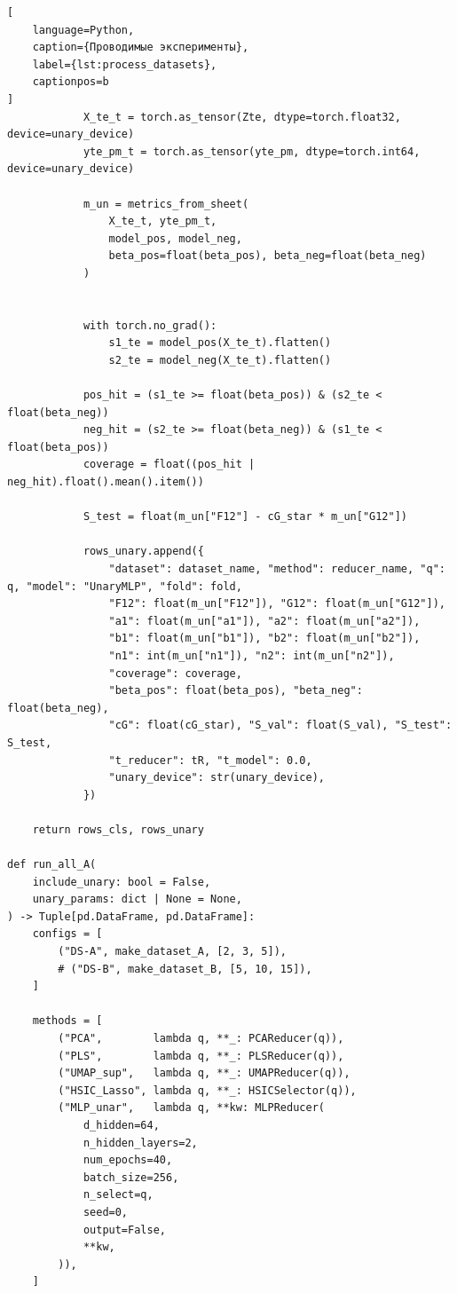 \documentclass[12pt,a4paper]{article}
\begin{document}
\begin{lstlisting}[
    language=Python,
    caption={Проводимые эксперименты},
    label={lst:process_datasets},
    captionpos=b
]
            X_te_t = torch.as_tensor(Zte, dtype=torch.float32, device=unary_device)
            yte_pm_t = torch.as_tensor(yte_pm, dtype=torch.int64, device=unary_device)

            m_un = metrics_from_sheet(
                X_te_t, yte_pm_t,
                model_pos, model_neg,
                beta_pos=float(beta_pos), beta_neg=float(beta_neg)
            )


            with torch.no_grad():
                s1_te = model_pos(X_te_t).flatten()
                s2_te = model_neg(X_te_t).flatten()

            pos_hit = (s1_te >= float(beta_pos)) & (s2_te <  float(beta_neg))
            neg_hit = (s2_te >= float(beta_neg)) & (s1_te <  float(beta_pos))
            coverage = float((pos_hit | neg_hit).float().mean().item())

            S_test = float(m_un["F12"] - cG_star * m_un["G12"])

            rows_unary.append({
                "dataset": dataset_name, "method": reducer_name, "q": q, "model": "UnaryMLP", "fold": fold,
                "F12": float(m_un["F12"]), "G12": float(m_un["G12"]),
                "a1": float(m_un["a1"]), "a2": float(m_un["a2"]),
                "b1": float(m_un["b1"]), "b2": float(m_un["b2"]),
                "n1": int(m_un["n1"]), "n2": int(m_un["n2"]),
                "coverage": coverage,
                "beta_pos": float(beta_pos), "beta_neg": float(beta_neg),
                "cG": float(cG_star), "S_val": float(S_val), "S_test": S_test,
                "t_reducer": tR, "t_model": 0.0,
                "unary_device": str(unary_device),
            })

    return rows_cls, rows_unary

def run_all_A(
    include_unary: bool = False,
    unary_params: dict | None = None,
) -> Tuple[pd.DataFrame, pd.DataFrame]:
    configs = [
        ("DS-A", make_dataset_A, [2, 3, 5]),
        # ("DS-B", make_dataset_B, [5, 10, 15]),
    ]

    methods = [
        ("PCA",        lambda q, **_: PCAReducer(q)),
        ("PLS",        lambda q, **_: PLSReducer(q)),
        ("UMAP_sup",   lambda q, **_: UMAPReducer(q)),
        ("HSIC_Lasso", lambda q, **_: HSICSelector(q)),
        ("MLP_unar",   lambda q, **kw: MLPReducer(
            d_hidden=64,
            n_hidden_layers=2,
            num_epochs=40,
            batch_size=256,
            n_select=q,
            seed=0,
            output=False,
            **kw,   
        )),
    ]



\end{lstlisting}
\end{document}
